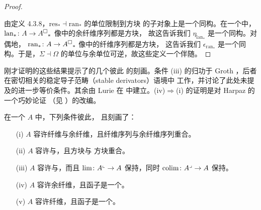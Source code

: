 \begin{proof}
\begin{center}
\end{center}
由定义 4.3.8，$\mathrm{res}_{*}\dashv\mathrm{ran}_{*}$ 的单位限制到\trPushout{}方块
的子对象上是一个同构。在一个\trStable{}\trInfinityCategory{}中，
$\mathrm{lan}_{*}\colon A\to{A^{\square}}_{*}$ 像中的余纤维序列都是\trPullback{}方块，
故这告诉我们 $\eta_{\mathrm{lan}_{*}}$ 是一个同构。对偶地，
$\mathrm{ran}_{*}\colon A\to{A^{\square}}_{*}$ 像中的纤维序列都是\trPushout{}方块，
这告诉我们 $\epsilon_{\mathrm{ran}_{*}}$ 是一个同构。于是，$\Sigma\dashv\Omega$
的单位与余单位可逆，故这些\trFunctor{}定义一个伴随\trEquivalence{}。
\end{proof}

刚才证明的这些结果提示了\trStable{}\trInfinityCategory{}的几个彼此%
\trEquivalence{}的刻画。条件 (iii) 的\trEquivalence{}归功于 Groth
\cite[\S3]{bib49}，后者在密切相关的稳定导子范畴（stable derivators）语境中
工作，并讨论了此处未提及的进一步等价条件。其余\trEquivalence{}由 Lurie 在
\cite{bib77}中建立。(iv)$\Rightarrow$(i) 的证明是对 Harpaz 的一个巧妙论证
（见 \cite[2.4]{bib51}）的改编。

\begin{theorem}\label{thm:stable-characterizations}
在一个\trPointed{}\trInfinityCategory{} $A$ 中，下列条件彼此\trEquivalence{}，
且刻画了\textbf{\trStable{}\trInfinityCategory}：
\begin{itemize}
\item[(i)] $A$ 容许纤维与余纤维，且纤维序列与余纤维序列重合。
\item[(ii)] $A$ 容许\trPullback{}与\trPushout{}，且\trPullback{}方块与%
\trPushout{}方块重合。
\item[(iii)] $A$ 容许\trPullback{}与\trPushout{}，而且\trPullback\trFunctor{}
$\lim\colon A^{\llcorner}\to A$ 保持\trPushout{}，同时\trPushout\trFunctor{}
$\operatorname{colim}\nolimits\colon A^{\lrcorner}\to A$ 保持\trPullback{}。
\item[(iv)] $A$ 容许余纤维，且\trSuspension{}函子是一个\trEquivalence{}。
\item[(v)] $A$ 容许纤维，且\trLoops{}函子是一个\trEquivalence{}。
\end{itemize}
\end{theorem}

